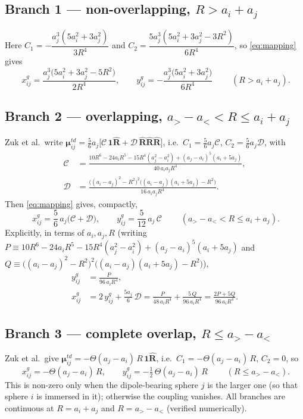 \documentclass[11pt]{article}
\newcommand{\Rh}{\hat{\mathbf{R}}}
\newcommand{\one}{\mathbf{1}}
\begin{document}
\subsection*{Branch 1 --- non-overlapping, $R>a_i+a_j$}
Here $C_1=-\dfrac{a_j^3(5a_i^2+3a_j^2)}{3R^4}$ and
$C_2=\dfrac{5a_j^3(5a_i^2+3a_j^2-3R^2)}{6R^4}$, so \eqref{eq:mapping} gives
\begin{equation}
\boxed{\;
x^g_{ij}=\frac{a_j^3\big(5a_i^2+3a_j^2-5R^2\big)}{2R^4},
\qquad
y^g_{ij}=-\frac{a_j^3\big(5a_i^2+3a_j^2\big)}{6R^4}\;}
\qquad (R>a_i+a_j).
\end{equation}

\subsection*{Branch 2 --- overlapping, $a_>-a_<<R\le a_i+a_j$}
Zuk et al.\ write $\bm{\mu}^{td}_{ij}=\tfrac{5}{6}a_j\big[\mathscr{C}\,\one\Rh+\mathscr{D}\,\Rh\Rh\Rh\big]$,
i.e.\ $C_1=\tfrac56 a_j\mathscr{C}$, $C_2=\tfrac56 a_j\mathscr{D}$, with
\begin{align}
\mathscr{C}&=\frac{10R^6-24a_iR^5-15R^4(a_j^2-a_i^2)+(a_j-a_i)^5(a_i+5a_j)}{40\,a_i a_j R^4},\\[4pt]
\mathscr{D}&=\frac{\big((a_i-a_j)^2-R^2\big)^2\big((a_i-a_j)(a_i+5a_j)-R^2\big)}{16\,a_i a_j R^4}.
\end{align}
Then \eqref{eq:mapping} gives, compactly,
\begin{equation}
\boxed{\;
x^g_{ij}=\frac{5}{6}\,a_j\big(\mathscr{C}+\mathscr{D}\big),
\qquad
y^g_{ij}=\frac{5}{12}\,a_j\,\mathscr{C}\;}
\qquad (a_>-a_<<R\le a_i+a_j).
\end{equation}
Explicitly, in terms of $a_i,a_j,R$ (writing $P\equiv 10R^6-24a_iR^5-15R^4(a_j^2-a_i^2)+(a_j-a_i)^5(a_i+5a_j)$
and $Q\equiv\big((a_i-a_j)^2-R^2\big)^2\big((a_i-a_j)(a_i+5a_j)-R^2\big)$),
\begin{align}
y^g_{ij}&=\frac{P}{96\,a_i R^4},\\[4pt]
x^g_{ij}&=2\,y^g_{ij}+\frac{5a_j}{6}\,\mathscr{D}
=\frac{P}{48\,a_i R^4}+\frac{5\,Q}{96\,a_i R^4}
=\frac{2P+5Q}{96\,a_i R^4}.
\end{align}

\subsection*{Branch 3 --- complete overlap, $R\le a_>-a_<$}
Zuk et al.\ give $\bm{\mu}^{td}_{ij}=-\Theta(a_j-a_i)\,R\,\one\Rh$, i.e.\ $C_1=-\Theta(a_j-a_i)\,R$,
$C_2=0$, so
\begin{equation}
\boxed{\;
x^g_{ij}=-\Theta(a_j-a_i)\,R,
\qquad
y^g_{ij}=-\tfrac12\,\Theta(a_j-a_i)\,R\;}
\qquad (R\le a_>-a_<).
\end{equation}
This is non-zero only when the dipole-bearing sphere $j$ is the larger one (so that sphere
$i$ is immersed in it); otherwise the coupling vanishes.  All branches are continuous at
$R=a_i+a_j$ and $R=a_>-a_<$ (verified numerically).
\end{document}

